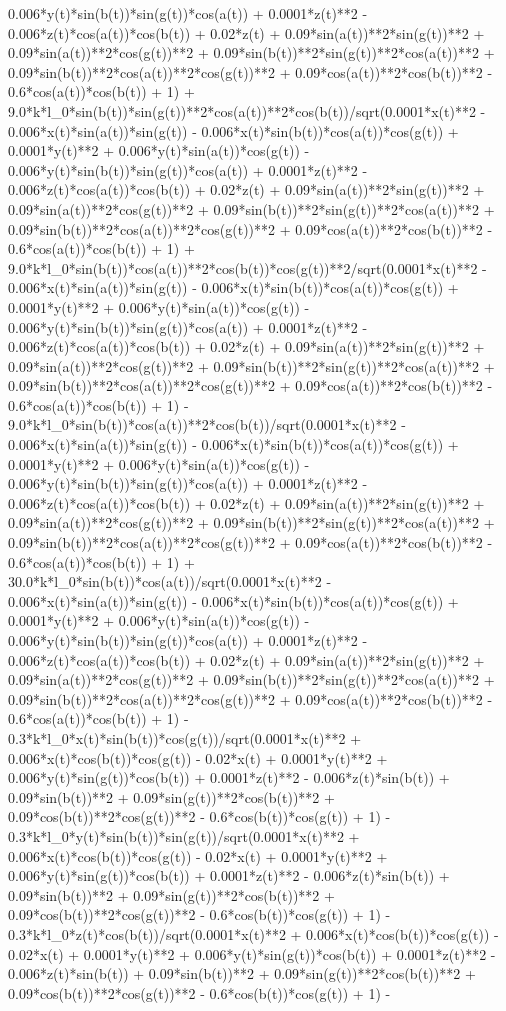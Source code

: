 0.006*y(t)*sin(b(t))*sin(g(t))*cos(a(t)) + 0.0001*z(t)**2 - 0.006*z(t)*cos(a(t))*cos(b(t)) + 0.02*z(t) + 0.09*sin(a(t))**2*sin(g(t))**2 + 0.09*sin(a(t))**2*cos(g(t))**2 + 0.09*sin(b(t))**2*sin(g(t))**2*cos(a(t))**2 + 0.09*sin(b(t))**2*cos(a(t))**2*cos(g(t))**2 + 0.09*cos(a(t))**2*cos(b(t))**2 - 0.6*cos(a(t))*cos(b(t)) + 1) + 9.0*k*l_0*sin(b(t))*sin(g(t))**2*cos(a(t))**2*cos(b(t))/sqrt(0.0001*x(t)**2 - 0.006*x(t)*sin(a(t))*sin(g(t)) - 0.006*x(t)*sin(b(t))*cos(a(t))*cos(g(t)) + 0.0001*y(t)**2 + 0.006*y(t)*sin(a(t))*cos(g(t)) - 0.006*y(t)*sin(b(t))*sin(g(t))*cos(a(t)) + 0.0001*z(t)**2 - 0.006*z(t)*cos(a(t))*cos(b(t)) + 0.02*z(t) + 0.09*sin(a(t))**2*sin(g(t))**2 + 0.09*sin(a(t))**2*cos(g(t))**2 + 0.09*sin(b(t))**2*sin(g(t))**2*cos(a(t))**2 + 0.09*sin(b(t))**2*cos(a(t))**2*cos(g(t))**2 + 0.09*cos(a(t))**2*cos(b(t))**2 - 0.6*cos(a(t))*cos(b(t)) + 1) + 9.0*k*l_0*sin(b(t))*cos(a(t))**2*cos(b(t))*cos(g(t))**2/sqrt(0.0001*x(t)**2 - 0.006*x(t)*sin(a(t))*sin(g(t)) - 0.006*x(t)*sin(b(t))*cos(a(t))*cos(g(t)) + 0.0001*y(t)**2 + 0.006*y(t)*sin(a(t))*cos(g(t)) - 0.006*y(t)*sin(b(t))*sin(g(t))*cos(a(t)) + 0.0001*z(t)**2 - 0.006*z(t)*cos(a(t))*cos(b(t)) + 0.02*z(t) + 0.09*sin(a(t))**2*sin(g(t))**2 + 0.09*sin(a(t))**2*cos(g(t))**2 + 0.09*sin(b(t))**2*sin(g(t))**2*cos(a(t))**2 + 0.09*sin(b(t))**2*cos(a(t))**2*cos(g(t))**2 + 0.09*cos(a(t))**2*cos(b(t))**2 - 0.6*cos(a(t))*cos(b(t)) + 1) - 9.0*k*l_0*sin(b(t))*cos(a(t))**2*cos(b(t))/sqrt(0.0001*x(t)**2 - 0.006*x(t)*sin(a(t))*sin(g(t)) - 0.006*x(t)*sin(b(t))*cos(a(t))*cos(g(t)) + 0.0001*y(t)**2 + 0.006*y(t)*sin(a(t))*cos(g(t)) - 0.006*y(t)*sin(b(t))*sin(g(t))*cos(a(t)) + 0.0001*z(t)**2 - 0.006*z(t)*cos(a(t))*cos(b(t)) + 0.02*z(t) + 0.09*sin(a(t))**2*sin(g(t))**2 + 0.09*sin(a(t))**2*cos(g(t))**2 + 0.09*sin(b(t))**2*sin(g(t))**2*cos(a(t))**2 + 0.09*sin(b(t))**2*cos(a(t))**2*cos(g(t))**2 + 0.09*cos(a(t))**2*cos(b(t))**2 - 0.6*cos(a(t))*cos(b(t)) + 1) + 30.0*k*l_0*sin(b(t))*cos(a(t))/sqrt(0.0001*x(t)**2 - 0.006*x(t)*sin(a(t))*sin(g(t)) - 0.006*x(t)*sin(b(t))*cos(a(t))*cos(g(t)) + 0.0001*y(t)**2 + 0.006*y(t)*sin(a(t))*cos(g(t)) - 0.006*y(t)*sin(b(t))*sin(g(t))*cos(a(t)) + 0.0001*z(t)**2 - 0.006*z(t)*cos(a(t))*cos(b(t)) + 0.02*z(t) + 0.09*sin(a(t))**2*sin(g(t))**2 + 0.09*sin(a(t))**2*cos(g(t))**2 + 0.09*sin(b(t))**2*sin(g(t))**2*cos(a(t))**2 + 0.09*sin(b(t))**2*cos(a(t))**2*cos(g(t))**2 + 0.09*cos(a(t))**2*cos(b(t))**2 - 0.6*cos(a(t))*cos(b(t)) + 1) - 0.3*k*l_0*x(t)*sin(b(t))*cos(g(t))/sqrt(0.0001*x(t)**2 + 0.006*x(t)*cos(b(t))*cos(g(t)) - 0.02*x(t) + 0.0001*y(t)**2 + 0.006*y(t)*sin(g(t))*cos(b(t)) + 0.0001*z(t)**2 - 0.006*z(t)*sin(b(t)) + 0.09*sin(b(t))**2 + 0.09*sin(g(t))**2*cos(b(t))**2 + 0.09*cos(b(t))**2*cos(g(t))**2 - 0.6*cos(b(t))*cos(g(t)) + 1) - 0.3*k*l_0*y(t)*sin(b(t))*sin(g(t))/sqrt(0.0001*x(t)**2 + 0.006*x(t)*cos(b(t))*cos(g(t)) - 0.02*x(t) + 0.0001*y(t)**2 + 0.006*y(t)*sin(g(t))*cos(b(t)) + 0.0001*z(t)**2 - 0.006*z(t)*sin(b(t)) + 0.09*sin(b(t))**2 + 0.09*sin(g(t))**2*cos(b(t))**2 + 0.09*cos(b(t))**2*cos(g(t))**2 - 0.6*cos(b(t))*cos(g(t)) + 1) - 0.3*k*l_0*z(t)*cos(b(t))/sqrt(0.0001*x(t)**2 + 0.006*x(t)*cos(b(t))*cos(g(t)) - 0.02*x(t) + 0.0001*y(t)**2 + 0.006*y(t)*sin(g(t))*cos(b(t)) + 0.0001*z(t)**2 - 0.006*z(t)*sin(b(t)) + 0.09*sin(b(t))**2 + 0.09*sin(g(t))**2*cos(b(t))**2 + 0.09*cos(b(t))**2*cos(g(t))**2 - 0.6*cos(b(t))*cos(g(t)) + 1) - 